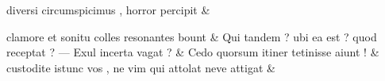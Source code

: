 \documentclass[12pt,onecolumn,twoside,a4paper]{memoir}
\begin{document}
\begin{pairs}
\begin{Leftside}
                              diversi
                              circumspicimus
                              ,
                              horror
                              percipit \&
                         \stanza {}
                     
                              clamore
                              et
                              sonitu
                              colles
                              resonantes
                              bount \&
                         \stanza {}
                     Qui
                              tandem
                              ?
                              ubi
                              ea
                              est
                              ?
                              quod
                              receptat
                              ?
                              —
                              Exul
                              incerta
                              vagat
                              ? \&
                         \stanza {}
                     Cedo
                              quorsum
                              itiner
                              tetinisse
                              aiunt
                              ! \&
                         \stanza {}
                     custodite
                              istunc
                              vos
                              ,
                              ne
                              vim
                              qui
                              attolat
                              neve
                              attigat \&
                         \stanza {}
                     

\end{Leftside}
\end{pairs}
\end{document}
